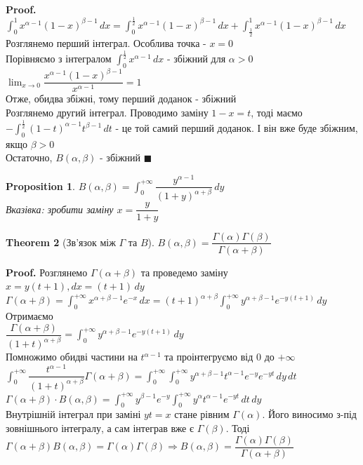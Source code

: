 \documentclass[a4paper, 14pt]{extarticle}
\def\huge{\displaystyle}
\theoremstyle{theoremdd}
\newtheorem{theorem}{Theorem}[subsection]
\theoremstyle{theoremdd}
\theoremstyle{theoremdd}
\theoremstyle{theoremdd}
\theoremstyle{theoremdd}
\newtheorem{proposition}[theorem]{Proposition}
\theoremstyle{theoremdd}
\theoremstyle{theoremdd}
\theoremstyle{theoremdd}
\newenvironment{pf}{\vspace*{-3mm} \textbf{Proof. \\}}{$\blacksquare$}
\begin{document}
\begin{pf}
$\huge \int_0^1 x^{\alpha-1} (1-x)^{\beta-1}\,dx = \int_0^{\frac{1}{2}} x^{\alpha-1} (1-x)^{\beta-1}\,dx +  \int_{\frac{1}{2}}^1 x^{\alpha-1} (1-x)^{\beta-1}\,dx$\\
Розглянемо перший інтеграл. Особлива точка - $x =0$\\
Порівняємо з інтегралом $\huge \int_0^{\frac{1}{2}} x^{\alpha - 1} \,dx$ - збіжний для $\alpha > 0$\\
$\huge \lim_{x \to 0} \dfrac{x^{\alpha-1}(1-x)^{\beta-1}}{x^{\alpha-1}} = 1$\\
Отже, обидва збіжні, тому перший доданок - збіжний\\
Розглянемо другий інтеграл. Проводимо заміну $1-x=t$, тоді маємо\\
$-\huge \int_{0}^{\frac{1}{2}} (1-t)^{\alpha-1} t^{\beta - 1}\,dt$ - це той самий перший доданок. І він вже буде збіжним, якщо $\beta > 0$\\
Остаточно, $B(\alpha, \beta)$ - збіжний
\end{pf}

\begin{proposition}
$B(\alpha, \beta) = \huge \int_0^{+\infty} \dfrac{y^{\alpha-1}}{(1+y)^{\alpha+\beta}}\,dy$\\
\textit{Вказівка: зробити заміну} $x = \dfrac{y}{1+y}$
\end{proposition}

\begin{theorem}[Зв'язок між $\Gamma$ та $B$]
$B(\alpha,\beta) = \dfrac{\Gamma(\alpha) \Gamma(\beta)}{\Gamma(\alpha+\beta)}$
\end{theorem}

\textbf{Proof.}
Розглянемо $\Gamma(\alpha+\beta)$ та проведемо заміну $x = y(t+1), dx = (t+1)\,dy$\\
$\Gamma(\alpha+\beta) = \huge \int_0^{+\infty} x^{\alpha+\beta-1} e^{-x}\,dx = (t+1)^{\alpha+\beta} \int_0^{+\infty} y^{\alpha+\beta-1}e^{-y(t+1)}\,dy$\\
Отримаємо\\
$\dfrac{\Gamma(\alpha+\beta)}{(1+t)^{\alpha+\beta}} = \huge \int_0^{+\infty} y^{\alpha+\beta-1}e^{-y(t+1)}\,dy$\\
Помножимо обидві частини на $t^{\alpha-1}$ та проінтегруємо від $0$ до $+\infty$\\
$\huge \int_0^{+\infty} \dfrac{t^{\alpha-1}}{(1+t)^{\alpha+\beta}} \Gamma(\alpha+\beta) = \huge \int_0^{+\infty} \int_0^{+\infty} y^{\alpha+\beta-1} t^{\alpha-1}e^{-y}e^{-yt}\,dy\,dt$\\
$\Gamma(\alpha+\beta) \cdot B(\alpha,\beta) = \huge \int_0^{+\infty} y^{\beta-1} e^{-y} \int_0^{+\infty} y^{\alpha} t^{\alpha-1}e^{-yt}\,dt \,dy$\\
Внутрішній інтеграл при заміні $yt = x$ стане рівним $\Gamma(\alpha)$. Його виносимо з-під зовнішнього інтегралу, а сам інтеграв вже є $\Gamma(\beta)$. Тоді\\
$\Gamma(\alpha+\beta) B(\alpha, \beta) = \Gamma(\alpha) \Gamma(\beta) \Rightarrow B(\alpha,\beta) = \dfrac{\Gamma(\alpha) \Gamma(\beta)}{\Gamma(\alpha+\beta)}$ \\
\scalebox{4}{$\blacksquare$}
\end{document}
